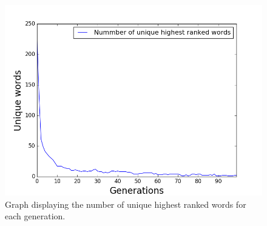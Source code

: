 \begin{figure}[htbp]
    \centering
    \includegraphics[scale=0.5]{fig/Results/Exp7/UniqueWords2}
    \caption{Graph displaying the number of unique highest ranked words for each generation.}
    \label{fig:UniqueWords7.1}
\end{figure}
